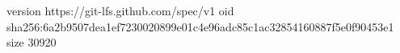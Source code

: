 version https://git-lfs.github.com/spec/v1
oid sha256:6a2b9507dea1ef7230020899e01c4e96adc85c1ac32854160887f5e0f90453e1
size 30920
